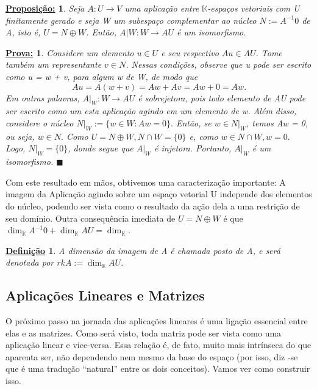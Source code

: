 \documentclass{article}
\newtheorem*{def*}{\underline{Defini\c c\~ao}}
\newtheorem*{proposition*}{\underline{Proposi\c c\~ao:}}
\newtheorem*{proof*}{\underline{Prova:}}
\renewcommand\qedsymbol{$\blacksquare$}
\begin{document}
\begin{proposition*}
	Seja $A:U\rightarrow{V}$ uma aplica\c c\~ao entre $\mathbb{K}$-espa\c cos vetoriais com U finitamente gerado e
	seja W um subespa\c co complementar ao n\'ucleo $N:= A^{-1}0$ de A, isto \'e, $U = N \oplus W$. Ent\~ao,
	$A|W: W \rightarrow AU$ \'e um isomorfismo.
\end{proposition*}
\begin{proof*}
	Considere um elemento $u\in{U}$ e seu respectivo $Au\in{AU}$. Tome tamb\'em um representante $v\in{N}$. Nessas
	condi\c c\~oes, observe que u pode ser escrito como u = w + v, para algum w de W, de modo que
	$$
		Au = A(w + v) = Aw + Av = Aw + 0 = Aw.
	$$
	Em outras palavras, $A|_W: W\rightarrow AU$ \'e sobrejetora, pois todo elemento de AU pode ser escrito como
	um esta aplica\c c\~ao agindo em um elemento de w. Al\'em disso, considere o n\'ucleo $N|_W:=\{w\in{W}: Aw = 0\}.$
	Ent\~ao, se $w\in{N|_W}$, temos Aw = 0, ou seja, $w\in{N}.$ Como $U = N\oplus{W}, N\cap{W} = \{0\}$ e, como
	$w\in{N\cap{W}}, w = 0.$ Logo, $N|_W = \{0\}$, donde segue que $A|_W$ \'e injetora. Portanto, $A|_W$ \'e um
	isomorfismo.
	\qedsymbol
\end{proof*}
Com este resultado em m\~aos, obtivemos uma caracteriza\c c\~ao importante: A imagem da Aplica\c c\~ao agindo
sobre um espa\c co vetorial U independe dos elementos do n\'ucleo, podendo ser vista como o resultado da a\c c\~ao
dela a uma restri\c c\~ao de seu dom\'inio. Outra consequ\^encia imediata de $U = N \oplus{W}$ \'e que
$\dim_{\mathbb{K}}A^{-1}0 + \dim_{\mathbb{K}} AU = \dim_{\mathbb{K}}$.
\begin{def*}
	A dimens\~ao da imagem de A \'e chamada posto de A, e ser\'a denotada por $rkA:=\dim_{\mathbb{K}}AU.$
\end{def*}

\subsection{Aplica\c c\~oes Lineares e Matrizes}

O pr\'oximo passo na jornada das aplica\c c\~oes lineares \'e uma liga\c c\~ao essencial entre elas e as matrizes.
Como ser\'a visto, toda matriz pode ser vista como uma aplica\c c\~ao linear e vice-versa. Essa rela\c c\~ao \'e,
de fato, muito mais intr\'inseca do que aparenta ser, n\~ao dependendo nem mesmo da base do espa\c co (por isso, diz
-se que \'e uma tradu\c c\~ao ``natural'' entre os dois conceitos). Vamos ver como construir isso.
\end{document}
